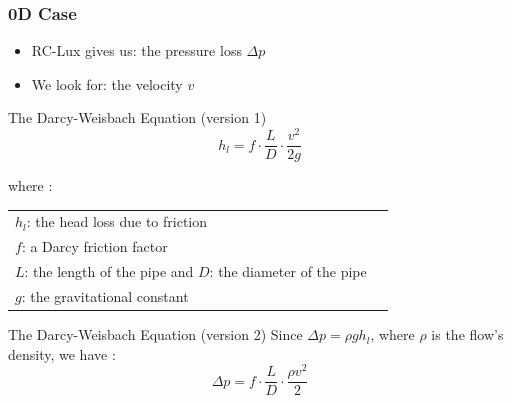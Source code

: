 \documentclass[xcolor=dvipsnames,10pt]{beamer}
\begin{document}
  \begin{frame}
          \frametitle{0D Case}
                  {\footnotesize
                  \begin{itemize}
                          \item RC-Lux gives us: the pressure loss $\Delta p$ 
                          \item We look for: the velocity $v$ 
                  \end{itemize}
                  \begin{block}{The Darcy-Weisbach Equation (version 1)}
                          \begin{equation}
                                  h_l = f \cdot \frac{L}{D} \cdot \frac{v^2}{2g}
                          \end{equation}
                  \end{block}
                  where : 
          \begin{tabular}{ll}
                  $h_l$: the head loss due to friction\\
                  $f$: a Darcy friction factor\\
                  $L$: the length of the pipe and $D$: the diameter of the pipe\\
                  $g$: the gravitational constant
          \end{tabular}
                  \begin{block}{The Darcy-Weisbach Equation (version 2)}
                          Since $\Delta p = \rho g h_l$, where $\rho$ is the flow's density, we have :
                          \begin{equation}
                                  \Delta p = f \cdot \frac{L}{D} \cdot \frac{\rho v^2}{2}
                          \end{equation}
                  \end{block}
  }
  \end{frame}
\end{document}
